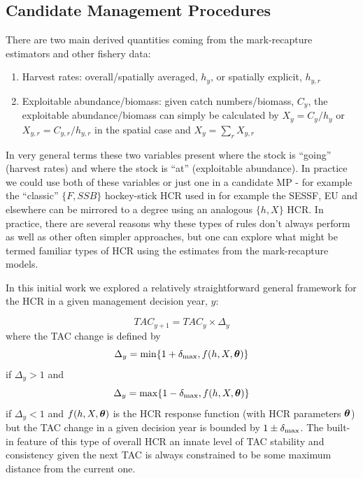\documentclass[12pt,a4paper,twoside,times,sky,standard]{csiroreport2017}
\newcommand{\ds}{\displaystyle}
\newcommand{\xtheta}{\mbox{\boldmath$\theta$}}
\begin{document}
\subsection{Candidate Management Procedures}

There are two main derived quantities coming from the mark-recapture estimators and other fishery data:

\begin{enumerate}
    \item Harvest rates: overall/spatially averaged, $h_y$, or spatially explicit, $h_{y,r}$
    \item Exploitable abundance/biomass: given catch numbers/biomass, $C_y$, the exploitable abundance/biomass can simply be calculated by $X_y=C_y/h_y$ or $X_{y,r}=C_{y,r}/h_{y,r}$ in the spatial case and $X_y=\sum_r X_{y,r}$
\end{enumerate}

In very general terms these two variables present where the stock is ``going'' (harvest rates) and where the stock is ``at'' (exploitable abundance). In practice we could use both of these variables or just one in a candidate MP - for example the ``classic'' $\{F,SSB\}$ hockey-stick HCR used in for example the SESSF, EU and elsewhere can be mirrored to a degree using an analogous $\{h,X\}$ HCR. In practice, there are several reasons why these types of rules don't always perform as well as other often simpler approaches, but one can explore what might be termed familiar types of HCR using the estimates from the mark-recapture models.

In this initial work we explored a relatively straightforward general framework for the HCR in a given management decision year, $y$:

\begin{equation*}
    \ds TAC_{y+1}=TAC_y\times\Delta_y
\end{equation*}
where the TAC change is defined by
\begin{equation*}
    \ds \Delta_y=\min\{1+\delta_{\rm max},f(h,X,\xtheta)\}
\end{equation*}
if $\Delta_y>1$ and 
\begin{equation*}
    \ds \Delta_y=\max\{1-\delta_{\rm max},f(h,X,\xtheta)\}
\end{equation*}
if $\Delta_y<1$ and $f(h,X,\xtheta)$ is the HCR response function (with HCR parameters $\xtheta$) but the TAC change in a given decision year is bounded by $1\pm\delta_{\rm max}$. The built-in feature of this type of overall HCR an innate level of TAC stability and consistency given the next TAC is always constrained to be some maximum distance from the current one. 
\end{document}
